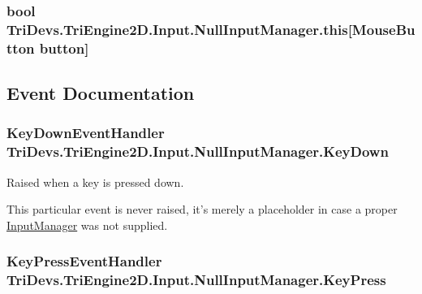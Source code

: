 \hypertarget{class_tri_devs_1_1_tri_engine2_d_1_1_input_1_1_null_input_manager_ac72562b9f98a5865412cd12ce87c6fbb}{
\subsubsection[{this[Mouse\-Button button]}]{\setlength{\rightskip}{0pt plus 5cm}bool Tri\-Devs.\-Tri\-Engine2\-D.\-Input.\-Null\-Input\-Manager.\-this\mbox{[}Mouse\-Button button\mbox{]}\hspace{0.3cm}{\ttfamily [get]}}}\label{class_tri_devs_1_1_tri_engine2_d_1_1_input_1_1_null_input_manager_ac72562b9f98a5865412cd12ce87c6fbb}


\subsection{Event Documentation}
\hypertarget{class_tri_devs_1_1_tri_engine2_d_1_1_input_1_1_null_input_manager_a2953b7a89a90ed5507ed516425bf84d2}{
\subsubsection[{Key\-Down}]{\setlength{\rightskip}{0pt plus 5cm}Key\-Down\-Event\-Handler Tri\-Devs.\-Tri\-Engine2\-D.\-Input.\-Null\-Input\-Manager.\-Key\-Down}}\label{class_tri_devs_1_1_tri_engine2_d_1_1_input_1_1_null_input_manager_a2953b7a89a90ed5507ed516425bf84d2}


Raised when a key is pressed down. 

This particular event is never raised, it's merely a placeholder in case a proper \hyperlink{class_tri_devs_1_1_tri_engine2_d_1_1_input_1_1_input_manager}{Input\-Manager} was not supplied. \hypertarget{class_tri_devs_1_1_tri_engine2_d_1_1_input_1_1_null_input_manager_aa5a1a6da1e59848800a1cf3e219569aa}{
\subsubsection[{Key\-Press}]{\setlength{\rightskip}{0pt plus 5cm}Key\-Press\-Event\-Handler Tri\-Devs.\-Tri\-Engine2\-D.\-Input.\-Null\-Input\-Manager.\-Key\-Press}}\label{class_tri_devs_1_1_tri_engine2_d_1_1_input_1_1_null_input_manager_aa5a1a6da1e59848800a1cf3e219569aa}


